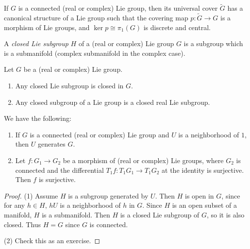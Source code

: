 \begin{theorem}
  If $G$ is a connected (real or complex)
  Lie group, then its universal cover
  $\widetilde{G}$ has a canonical
  structure of a Lie group such that
  the covering map
  $p : \widetilde{G} \to G$ is a morphism
  of Lie groups, and
  $\ker p \cong \pi_1(G)$ is discrete
  and central.
\end{theorem}

\begin{definition}
  A \emph{closed Lie subgroup} $H$ of a
  (real or complex) Lie group $G$
  is a subgroup which is a
  submanifold (complex submanifold
  in the complex case).
\end{definition}

\begin{theorem}
  Let $G$ be a (real or complex) Lie group.
  \begin{enumerate}
    \item Any closed Lie subgroup
      is closed in $G$.
    \item Any closed subgroup of a Lie
      group is a closed real Lie subgroup.
  \end{enumerate}
\end{theorem}

\begin{corollary}
  We have the following:
  \begin{enumerate}
    \item If $G$ is a connected (real or complex) Lie group
      and $U$ is a neighborhood of
      $1$, then $U$ generates $G$.
    \item Let $f : G_1 \to G_2$ be a
      morphism of (real or complex) Lie groups,
      where $G_2$ is connected and
      the differential
      $T_1 f : T_1 G_1 \to T_1 G_2$ at
      the identity is
      surjective. Then $f$ is surjective.
  \end{enumerate}
\end{corollary}

\begin{proof}
  (1) Assume $H$ is a subgroup generated
  by $U$. Then $H$ is open in $G$, since
  for any $h \in H$, $h U$ is a
  neighborhood of $h$ in $G$. Since
  $H$ is an open subset of a
  manifold, $H$ is a submanifold. Then
  $H$ is a closed Lie subgroup of $G$,
  so it is also closed. Thus $H = G$ since
  $G$ is connected.

  (2) Check this as an exercise.
\end{proof}
